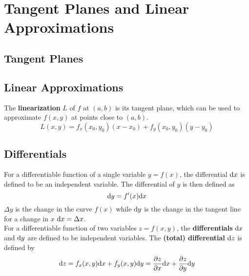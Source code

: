 \documentclass[../Calculus_\Roman{3}]{subfiles}
\begin{document}
	\section{Tangent Planes and Linear Approximations}
		\subsection*{Tangent Planes}
		\subsection*{Linear Approximations}
			The \textbf{linearization} $L$ of $f$ at $(a, b)$ is its tangent plane, which can be used to approximate $f(x, y)$ at points close to $(a, b)$.
				\[L(x, y) = f_x(x_0, y_0)(x - x_0) + f_y(x_0, y_0)(y - y_0)\]
		\subsection*{Differentials}
			For a differentiable function of a single variable $y = f(x)$, the differential $\mathrm{d} x$ is defined to be an independent variable. The differential of $y$ is then defined as
				\[\mathrm{d} y = f'(x)\mathrm{d} x\]
			$\Delta y$ is the change in the curve $f(x)$ while $\mathrm{d} y$ is the change in the tangent line for a change in $x$ $\mathrm{d} x = \Delta x$. \\
			For a differentiable function of two variables $z = f(x, y)$, the \textbf{differentials} $\mathrm{d} x$ and $\mathrm{d} y$ are defined to be independent variables. The \textbf{(total) differential} $\mathrm{d} z$ is defined by
				\[\mathrm{d} z = f_x(x, y)\mathrm{d} x + f_y(x, y)\mathrm{d} y = \frac{\partial z}{\partial x}\mathrm{d} x + \frac{\partial z}{\partial y}\mathrm{d} y\]
\end{document}
